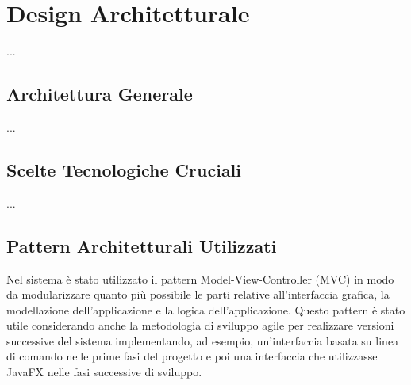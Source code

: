

\chapter{Design Architetturale}
    ...
    \section{Architettura Generale}
    ...
    
    \section{Scelte Tecnologiche Cruciali}
    ...
    \section{Pattern Architetturali Utilizzati}
        Nel sistema è stato utilizzato il pattern Model-View-Controller (MVC) in modo da modularizzare quanto più possibile le parti relative all'interfaccia grafica, la modellazione dell'applicazione e la logica dell'applicazione. 
        Questo pattern è stato utile considerando anche la metodologia di sviluppo agile per realizzare versioni successive del sistema implementando, ad esempio, un'interfaccia basata su linea di comando nelle prime fasi del progetto e poi una interfaccia che utilizzasse JavaFX nelle fasi successive di sviluppo.
        
